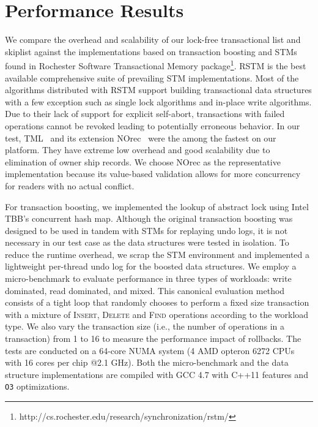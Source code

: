 \documentclass[10pt,conference,compsocconf]{IEEEtran}
\begin{document}
\section{Performance Results}
\label{sec:experiment}
We compare the overhead and scalability of our lock-free transactional list and skiplist against the implementations based on transaction boosting and STMs found in Rochester Software Transactional Memory package\footnote{http://cs.rochester.edu/research/synchronization/rstm/}.
RSTM is the best available comprehensive suite of prevailing STM implementations.
Most of the algorithms distributed with RSTM support building transactional data structures with a few exception such as single lock algorithms and in-place write algorithms. 
Due to their lack of support for explicit self-abort, transactions with failed operations cannot be revoked leading to potentially erroneous behavior.  
In our test, TML~\cite{dalessandro2010norec} and its extension NOrec~\cite{dalessandro2010norec} were the among the fastest on our platform.
They have extreme low overhead and good scalability due to elimination of owner ship records.
We choose NOrec as the representative implementation because its value-based validation allows for more concurrency for readers with no actual conflict.

For transaction boosting, we implemented the lookup of abstract lock using Intel TBB's concurrent hash map.
Although the original transaction boosting was designed to be used in tandem with STMs for replaying undo logs, it is not necessary in our test case as the data structures were tested in isolation.
To reduce the runtime overhead, we scrap the STM environment and implemented a lightweight per-thread undo log for the boosted data structures.
We employ a micro-benchmark to evaluate performance in three types of workloads: write dominated, read dominated, and mixed.
This canonical evaluation method~\cite{dalessandro2010norec,harris2001pragmatic} consists of a tight loop that randomly chooses to perform a fixed size transaction with a mixture of \textsc{Insert}, \textsc{Delete} and \textsc{Find} operations according to the workload type.
We also vary the transaction size (i.e., the number of operations in a transaction) from 1 to 16 to measure the performance impact of rollbacks.
The tests are conducted on a 64-core NUMA system (4 AMD opteron 6272 CPUs with 16 cores per chip @2.1 GHz). 
Both the micro-benchmark and the data structure implementations are compiled with GCC 4.7 with C++11 features and \texttt{O3} optimizations.
\end{document}
